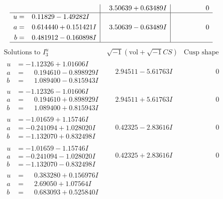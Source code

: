 \documentclass[1p]{elsarticle_modified}
\theoremstyle{definition}
\newcommand{\I}{\sqrt{-1}}
\begin{document}
$$\begin{array}{c|c|c}
 & \phantom{-}3.50639 + 0.63489 I & \phantom{-0.000000 } 0 \\ \hline\begin{aligned}
u &= \phantom{-}0.11829 - 1.49282 I \\
a &= \phantom{-}0.614440 + 0.151421 I \\
b &= \phantom{-}0.481912 - 0.160898 I\end{aligned}
 & \phantom{-}3.50639 - 0.63489 I & \phantom{-0.000000 } 0\\
 \hline 
 \end{array}$$\newpage$$\begin{array}{c|c|c}  
\text{Solutions to }I^u_{3}& \I (\text{vol} + \sqrt{-1}CS) & \text{Cusp shape}\\
 \hline 
\begin{aligned}
u &= -1.12326 + 1.01606 I \\
a &= \phantom{-}0.194610 - 0.898929 I \\
b &= \phantom{-}1.089400 - 0.815943 I\end{aligned}
 & \phantom{-}2.94511 - 5.61763 I & \phantom{-0.000000 } 0 \\ \hline\begin{aligned}
u &= -1.12326 - 1.01606 I \\
a &= \phantom{-}0.194610 + 0.898929 I \\
b &= \phantom{-}1.089400 + 0.815943 I\end{aligned}
 & \phantom{-}2.94511 + 5.61763 I & \phantom{-0.000000 } 0 \\ \hline\begin{aligned}
u &= -1.01659 + 1.15746 I \\
a &= -0.241094 + 1.028020 I \\
b &= -1.132070 + 0.832498 I\end{aligned}
 & \phantom{-}0.42325 - 2.83616 I & \phantom{-0.000000 } 0 \\ \hline\begin{aligned}
u &= -1.01659 - 1.15746 I \\
a &= -0.241094 - 1.028020 I \\
b &= -1.132070 - 0.832498 I\end{aligned}
 & \phantom{-}0.42325 + 2.83616 I & \phantom{-0.000000 } 0 \\ \hline\begin{aligned}
u &= \phantom{-}0.383280 + 0.156976 I \\
a &= \phantom{-}2.69050 + 1.07564 I \\
b &= \phantom{-}0.683093 + 0.525840 I\end{aligned}

\end{array}$$
\end{document}
